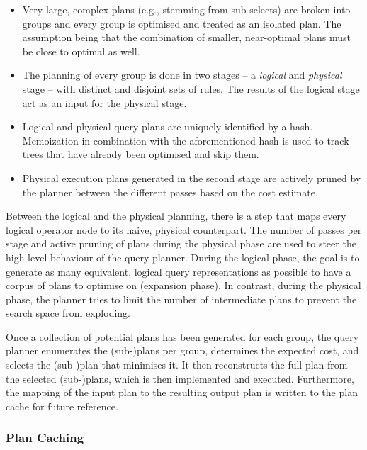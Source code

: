 \begin{itemize}
    \item Very large, complex plans (e.g., stemming from sub-selects) are broken into groups and every group is optimised and treated as an isolated plan. The assumption being that the combination of smaller, near-optimal plans must be close to optimal as well.
    \item The planning of every group is done in two stages -- a \emph{logical} and \emph{physical} stage -- with distinct and disjoint sets of rules. The results of the logical stage act as an input for the physical stage.
    \item Logical and physical query plans are uniquely identified by a hash. Memoization in combination with the aforementioned hash is used to track trees that have already been optimised and skip them.
    \item Physical execution plans generated in the second stage are actively pruned by the planner between the different passes based on the cost estimate.
\end{itemize}

Between the logical and the physical planning, there is a step that maps every logical operator node to its naive, physical counterpart. The number of passes per stage and active pruning of plans during the physical phase are used to steer the high-level behaviour of the query planner. During the logical phase, the goal is to generate as many equivalent, logical query representations as possible to have a corpus of plans to optimise on (expansion phase). In contrast, during the physical phase, the planner tries to limit the number of intermediate plans to prevent the search space from exploding.

Once a collection of potential plans has been generated for each group, the query planner enumerates the (sub-)plans per group, determines the expected cost, and selects the (sub-)plan that minimises it. It then reconstructs the full plan from the selected (sub-)plans, which is then implemented and executed. Furthermore, the mapping of the input plan to the resulting output plan is written to the plan cache for future reference.

\subsubsection{Plan Caching}

